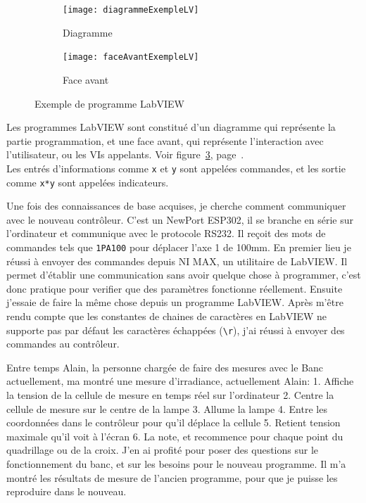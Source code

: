 \documentclass[12pt]{article}
\begin{document}
\begin{figure}[h]
	\begin{subfigure}{0.5\textwidth}
		\centering
		\texttt{[image: diagrammeExempleLV]}
		\caption{Diagramme}
		\label{fig:exempleDiagramme}
	\end{subfigure}
	\begin{subfigure}{0.5\textwidth}
		\centering
		\texttt{[image: faceAvantExempleLV]}
		\caption{Face avant}
		\label{fig:exempleFaceAvant}
	\end{subfigure}

	\caption{Exemple de programme LabVIEW}
	\label{fig:exempleLabVIEW}
\end{figure}



Les programmes LabVIEW sont constitué d'un diagramme qui représente la partie programmation, et une face avant, qui représente l'interaction avec l'utilisateur, ou les VIs appelants.
Voir figure~\ref{fig:exempleLabVIEW}, page~\pageref{fig:exempleLabVIEW}.\\
Les entrés d'informations comme \verb|x| et \verb|y| sont appelées commandes, et les sortie comme \verb|x*y| sont appelées indicateurs.


Une fois des connaissances de base acquises, je cherche comment communiquer avec le nouveau contrôleur.
C'est un NewPort ESP302, il se branche en série sur l'ordinateur et communique avec le protocole RS232.
Il reçoit des mots de commandes tels que \verb|1PA100| pour déplacer l'axe 1 de 100mm.
En premier lieu je réussi à envoyer des commandes depuis NI MAX, un utilitaire de LabVIEW.
Il permet d'établir une communication sans avoir quelque chose à programmer, c'est donc pratique pour verifier que des paramètres fonctionne réellement.
Ensuite j'essaie de faire la même chose depuis un programme LabVIEW.
Après m'être rendu compte que les constantes de chaines de caractères en LabVIEW ne supporte pas par défaut les caractères échappées (\texttt{\textbackslash r}), j'ai réussi à envoyer des commandes au contrôleur.

Entre temps Alain, la personne chargée de faire des mesures avec le Banc actuellement, ma montré une mesure d'irradiance, actuellement Alain:
1. Affiche la tension de la cellule de mesure en temps réel sur l'ordinateur
2. Centre la cellule de mesure sur le centre de la lampe
3. Allume la lampe
4. Entre les coordonnées dans le contrôleur pour qu'il déplace la cellule
5. Retient tension maximale qu'il voit à l'écran
6. La note, et recommence pour chaque point du quadrillage ou de la croix.
J'en ai profité pour poser des questions sur le fonctionnement du banc, et sur les besoins pour le nouveau programme.
Il m'a montré les résultats de mesure de l'ancien programme, pour que je puisse les reproduire dans le nouveau.
\end{document}
